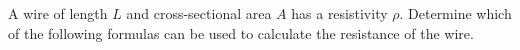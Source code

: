 A wire of length $L$ and cross-sectional area $A$ has a resistivity 
$\rho $. 
Determine which of the following formulas can be
used to calculate the resistance of the wire.